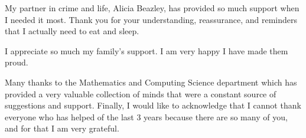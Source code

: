 My partner in crime and life, Alicia Beazley, has provided so much support when I needed it most.
Thank you for your understanding, reassurance, and reminders that I actually need to eat and sleep.

I appreciate so much my family's support.
I am very happy I have made them proud.

Many thanks to the Mathematics and Computing Science department which has provided a very valuable collection of minds that were a constant source of suggestions and support.
Finally, I would like to acknowledge that I cannot thank everyone who has helped of the last 3 years because there are so many of you, and for that I am very grateful.

\clearpage
{} %
\setcounter{page}{1}

